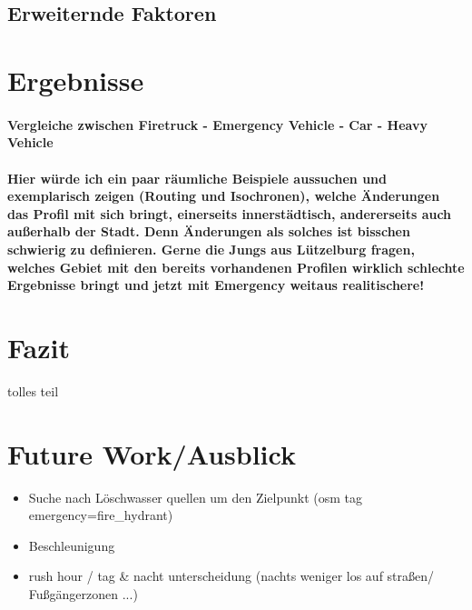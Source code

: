 \documentclass[10pt,a4paper]{article}
\begin{document}
\subsection{Erweiternde Faktoren}

\section{Ergebnisse}
\paragraph{
Vergleiche zwischen Firetruck - Emergency Vehicle - Car - Heavy Vehicle
}
\paragraph{
\color{red}
Hier würde ich ein paar räumliche Beispiele aussuchen und exemplarisch zeigen (Routing und Isochronen), welche Änderungen das Profil mit sich bringt, einerseits innerstädtisch, andererseits auch außerhalb der Stadt. Denn Änderungen als solches ist bisschen schwierig zu definieren. Gerne die Jungs aus Lützelburg fragen, welches Gebiet mit den bereits vorhandenen Profilen wirklich schlechte Ergebnisse bringt und jetzt mit Emergency weitaus realitischere!
}

\section{Fazit}

tolles teil

\section{Future Work/Ausblick}
\begin{itemize}
\item Suche nach Löschwasser quellen um den Zielpunkt (osm tag emergency=fire_hydrant)
\item Beschleunigung
\item rush hour / tag & nacht unterscheidung (nachts weniger los auf straßen/ Fußgängerzonen ...)
\end{itemize}
\end{document}
